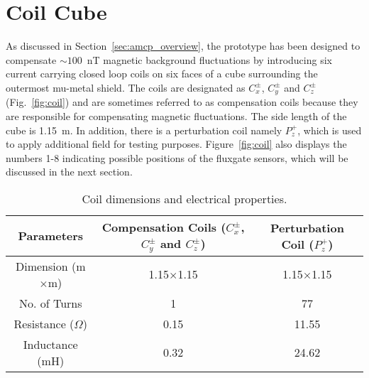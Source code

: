 
\section{Coil Cube}\label{sec:cube}


As discussed in Section~\ref{sec:amcp_overview}, the prototype has been designed to compensate $\sim 100$~nT magnetic background fluctuations by introducing six current carrying closed loop coils on six faces of a cube surrounding the outermost mu-metal shield. The coils are designated as $C_x^\pm$, $C_y^\pm$ and $C_z^\pm$ (Fig.~\ref{fig:coil}) and are sometimes referred to as compensation coils because they are responsible for compensating magnetic fluctuations. The side length of the cube is 1.15~m. In addition, there is a perturbation coil namely $P_z^+$, which is used to apply additional field for testing purposes. Figure~\ref{fig:coil} also displays the numbers 1-8 indicating possible positions of the fluxgate sensors, which will be discussed in the next section.


\begin{table} [!htb]
    \centering
    \begin{tabular} { |c|c|c| } 
        \hline
        Parameters & \makecell{Compensation Coils \\ ($C_x^\pm$, $C_y^\pm$ and $C_z^\pm$)} & \makecell{Perturbation Coil \\ ($P_z^+$)} \\
        \hline\hline
        Dimension (m$\times$m) & 1.15$\times$1.15 & 1.15$\times$1.15\\ 
        \hline
        No. of Turns & 1 & 77\\ 
        \hline
        Resistance ($\Omega$) & 0.15 & 11.55\\ 
        \hline
        Inductance (mH) & 0.32 & 24.62\\
         \hline
    \end{tabular}
    \caption{Coil dimensions and electrical properties.}\label{table:coil}
\end{table}

